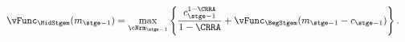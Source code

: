   \begin{equation}\begin{gathered}\begin{aligned}
        {\vFunc}_{\MidStgem}({m}_{\stge-1})   & = \max_{\cNrm_{\stge-1}}
        \left\{
          \frac{{c}_{\stge-1}^{1-\CRRA}}{1-\CRRA} +
          \vFunc_{\BegStgem}({m}_{\stge-1}-{c}_{\stge-1})
        \right\}.
        \label{eq:vEndTm1}
      \end{aligned}\end{gathered}\end{equation}%
